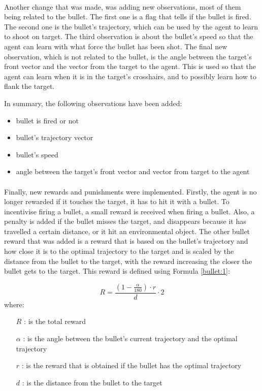 \paragraph{}
Another change that was made, was adding new observations, most of them being related to the bullet. The first one is a flag that tells if the bullet is fired. The second one is the bullet's trajectory, which can be used by the agent to learn to shoot on target. The third observation is about the bullet's speed so that the agent can learn with what force the bullet has been shot. The final new observation, which is not related to the bullet, is the angle between the target's front vector and the vector from the target to the agent. This is used so that the agent can learn when it is in the target's crosshairs, and to possibly learn how to flank the target. 

In summary, the following observations have been added:
\begin{itemize}
    \item bullet is fired or not
    \item bullet's trajectory vector
    \item bullet's speed
    \item angle between the target's front vector and vector from target to the agent
\end{itemize}


\paragraph{}
Finally, new rewards and punishments were implemented. Firstly, the agent is no longer rewarded if it touches the target, it has to hit it with a bullet. To incentivise firing a bullet, a small reward is received when firing a bullet. Also, a penalty is added if the bullet misses the target, and disappears because it has travelled a certain distance, or it hit an environmental object. The other bullet reward that was added is a reward that is based on the bullet's trajectory and how close it is to the optimal trajectory to the target and is scaled by the distance from the bullet to the target, with the reward increasing the closer the bullet gets to the target. This reward is defined using Formula \ref{bullet:1}:

\begin{equation} \label{bullet:1}
    R = \frac{(1 - \frac{\alpha}{180}) \cdot r}{d} \cdot 2
\end{equation}
where:
\begin{itemize}
    \item [$R$]: is the total reward
    \item [$\alpha$]: is the angle between the bullet's current trajectory and the optimal trajectory
    \item [$r$]: is the reward that is obtained if the bullet has the optimal trajectory
    \item [$d$]: is the distance from the bullet to the target
\end{itemize}

